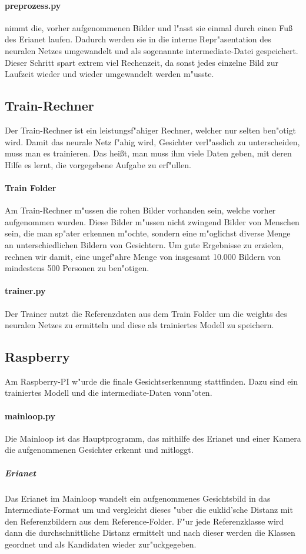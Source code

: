 \documentclass[12pt]{article}
\begin{document}
\paragraph{preprozess.py}
nimmt die, vorher aufgenommenen Bilder und l"asst sie einmal 
durch einen Fu{\ss} des Erianet laufen. Dadurch
werden sie in die interne Repr"asentation des neuralen Netzes 
umgewandelt und als sogenannte intermediate-Datei gespeichert.
Dieser Schritt spart extrem viel Rechenzeit, da sonst
jedes einzelne Bild zur Laufzeit wieder und wieder 
umgewandelt werden m"usste.
\subsection{Train-Rechner}
Der Train-Rechner ist ein leistungsf"ahiger Rechner, welcher nur selten
ben"otigt wird. Damit das neurale Netz f"ahig wird, Gesichter verl"asslich
zu unterscheiden, muss man es trainieren. Das hei{\ss}t, man muss ihm viele
Daten geben, mit deren Hilfe es lernt, die vorgegebene Aufgabe zu erf"ullen.
\paragraph{Train Folder} Am Train-Rechner m"ussen die rohen
Bilder vorhanden sein, welche vorher aufgenommen wurden.
Diese Bilder m"ussen nicht zwingend Bilder von Menschen sein,
die man sp"ater erkennen m"ochte, sondern eine m"oglichst diverse
Menge an unterschiedlichen Bildern von Gesichtern. Um gute Ergebnisse
zu erzielen, rechnen wir damit, eine ungef"ahre Menge von insgesamt
10.000 Bildern von mindestens 500 Personen zu ben"otigen.
\paragraph{trainer.py}
Der Trainer nutzt die Referenzdaten aus dem Train Folder 
um die weights des neuralen Netzes zu ermitteln und diese
als trainiertes Modell zu speichern.
\subsection{Raspberry}
Am Raspberry-PI w"urde die finale Gesichtserkennung stattfinden.
Dazu sind ein trainiertes Modell und die intermediate-Daten vonn"oten.
\paragraph{mainloop.py}
Die Mainloop ist das Hauptprogramm, das mithilfe des Erianet und einer Kamera
die aufgenommenen Gesichter erkennt und mitloggt.
\subparagraph{Erianet}
Das Erianet im Mainloop wandelt ein aufgenommenes Gesichtsbild in
das Intermediate-Format um und vergleicht dieses "uber die 
euklid'sche Distanz mit den Referenzbildern aus dem Reference-Folder.
F"ur jede Referenzklasse wird dann die durchschnittliche Distanz
ermittelt und nach dieser werden die Klassen geordnet und als
Kandidaten wieder zur"uckgegeben.
\end{document}

